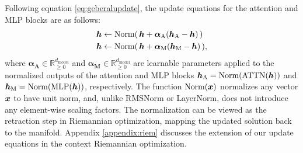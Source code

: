 \documentclass{article} %
\begin{document}
Following equation \ref{eq:geberalupdate}, the update equations for the attention and MLP blocks are as follows: 
\begin{align}
    {\bm{h}} &\leftarrow \text{Norm}(\,{\bm{h}} + \bm{\alpha_{\text{A}}}({\bm{h}}_{\text{A}}-{\bm{h}})\,) \label{eq:ATTNnew2} \\ 
    {\bm{h}} &\leftarrow \text{Norm}(\,{\bm{h}} + \bm{\alpha_{\text{M}}}({\bm{h}}_{\text{M}}-{\bm{h}})\,),  \label{eq:MLPnew2}
\end{align}
where $\bm{\alpha_{\text{A}}}\in \mathbb{R}_{\geq 0}^{d_{\text{model}}}$ and $\bm{\alpha_{\text{M}}}\in \mathbb{R}_{\geq 0}^{d_{\text{model}}}$ are learnable parameters applied to the normalized outputs of the attention and MLP blocks ${\bm{h}}_{\text{A}}=\text{Norm}(\text{ATTN}({\bm{h}}))$ and ${\bm{h}}_{\text{M}}=\text{Norm}(\text{MLP}({\bm{h}}))$, respectively. The function $\text{Norm}({\bm{x}})$ normalizes any vector ${\bm{x}}$ to have unit norm, and, unlike RMSNorm or LayerNorm, does not introduce any element-wise scaling factors. The normalization can be viewed as the retraction step in Riemannian optimization, mapping the updated solution back to the manifold. Appendix \ref{appendix:riem} discusses the extension of our update equations in the context Riemannian optimization. 
\end{document}
